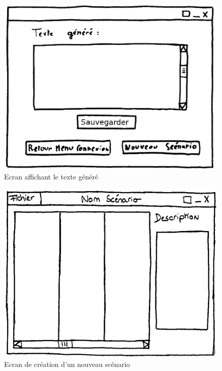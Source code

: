 \documentclass[12pt]{report}
\begin{document}
\begin{figure}
\centering
\includegraphics[scale=0.5]{IHM_4b.png}
\caption{Ecran affichant le texte généré}
\end{figure}
\begin{figure}
\centering
\includegraphics[scale=0.5]{IHM_6b.png}
\caption{Ecran de création d'un nouveau scénario}
\end{figure}
\end{document}
